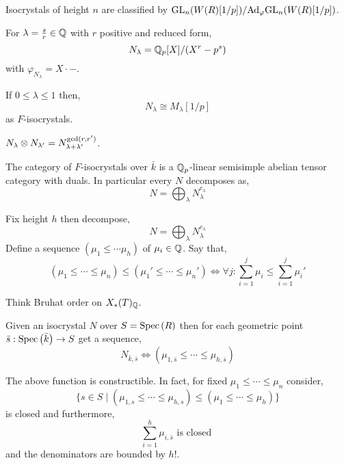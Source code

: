 \documentclass[12pt]{article}
\begin{document}
\begin{rmk}
Isocrystals of height $n$ are classified by $\mathrm{GL}_n(W(R)[1/p]) / \mathrm{Ad}_{\varphi} \mathrm{GL}_n(W(R)[1/p])$.
\end{rmk}

\begin{example}
For $\lambda = \frac{s}{r} \in \mathbb{Q}$ with $r$ positive and reduced form,
\[ N_\lambda = \mathbb{Q}_p[X] / (X^r - p^s) \]
with $\varphi_{N_\lambda} = X \cdot -$.
\end{example}

\begin{prop}
If $0 \le \lambda \le 1$ then,
\[ N_\lambda \cong M_\lambda[1/p] \]
as $F$-isocrystals. 
\end{prop}

\begin{prop}
$N_\lambda \otimes N_{\lambda'} = N_{\lambda + \lambda'}^{\gcd(r, r')}$.
\end{prop}

\begin{theorem}
The category of $F$-isocrystals over $\bar{k}$ is a $\mathbb{Q}_p$-linear semisimple abelian tensor category with duals. In particular every $N$ decomposes as,
\[ N = \bigoplus_\lambda N_\lambda^{c_\lambda} \]
\end{theorem}

\begin{defn}
Fix height $h$ then decompose,
\[ N = \bigoplus_\lambda N_\lambda^{c_\lambda} \]
Define a sequence $(\mu_1 \le \cdots \mu_h)$ of $\mu_i \in \mathbb{Q}$. Say that,
\[ (\mu_1 \le \cdots \le \mu_n) \le (\mu_1' \le \cdots \le \mu_n') \iff \forall j : \sum_{i = 1}^j \mu_i \le \sum_{i = 1}^j \mu_i' \]
\end{defn}

\begin{rmk}
Think Bruhat order on $X_*(T)_{\mathbb{Q}}$. 
\end{rmk}

\begin{defn}
Given an isocrystal $N$ over $S = \mathrm{Spec}\left( R \right)$ then for each geometric point $\bar{s} : \mathrm{Spec}\left( \bar{k} \right) \to S$ get a sequence,
\[ N_{\bar{k}, \bar{s}} \iff (\mu_{1, \bar{s}} \le \cdots \le \mu_{h, \bar{s}}) \]
\end{defn}

\begin{theorem}[Grothendieck]
The above function is constructible. In fact, for fixed $\mu_1 \le \cdots \le \mu_n$ consider,
\[ \{ s \in S \mid (\mu_{1,s} \le \cdots \le \mu_{h,s}) \le (\mu_1 \le \cdots \le \mu_h) \} \]
is closed and furthermore,
\[ \sum_{i = 1}^h \mu_{i, \bar{s}} \text{ is closed } \]
and the denominators are bounded by $h!$. 
\end{theorem}
\end{document}
